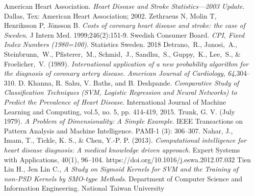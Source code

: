 \documentclass[conference]{IEEEtran}
\begin{document}
\begin{thebibliography}{1}

	American Heart Association. \emph{Heart Disease and Stroke Statistics—2003
		Update}. Dallas, Tex: American Heart Association; 2002.
	Zethraeus N, Molin T, Henriksson P, Jönsson B. \emph{Costs of coronary heart disease and stroke: the case of Sweden}. J Intern Med. 1999;246(2):151-9.
	Swedish Consumer Board. \emph{CPI, Fixed Index Numbers (1980=100)}. Statistics Sweden. 2018
Detrano,~R., Janosi,~A., Steinbrunn,~W., Pfisterer,~M., Schmid,~J.,
       Sandhu,~S., Guppy,~K., Lee,~S., \& Froelicher,~V. (1989).  {\it 
       International application of a new probability algorithm for the 
       diagnosis of coronary artery disease.}  {\it American Journal of 
       Cardiology}, {\it 64},304--310.
	D. Khanna, R. Sahu, V. Baths, and B. Deshpande. \emph{Comparative Study of Classification Techniques (SVM, Logistic Regression and Neural Networks) to Predict the Prevalence of Heart Disease}. International Journal of Machine Learning and Computing, vol.5, no. 5, pp. 414-419, 2015.
	Trunk, G. V. (July 1979). \emph{A Problem of Dimensionality: A Simple Example}. IEEE Transactions on Pattern Analysis and Machine Intelligence. PAMI-1 (3): 306–307.
	Nahar, J., Imam, T., Tickle, K. S., \& Chen, Y.-P. P. (2013). \emph{Computational intelligence for heart disease diagnosis: A medical knowledge driven approach}. Expert Systems with Applications, 40(1), 96–104. https://doi.org/10.1016/j.eswa.2012.07.032 
	Tien Lin H., Jen Lin C., \emph{A Study on Sigmoid Kernels for SVM and the Training of non-PSD Kernels by SMO-type Methods}. Department of Computer Science and Information Engineering. National Taiwan University

\end{thebibliography}




\end{document}
